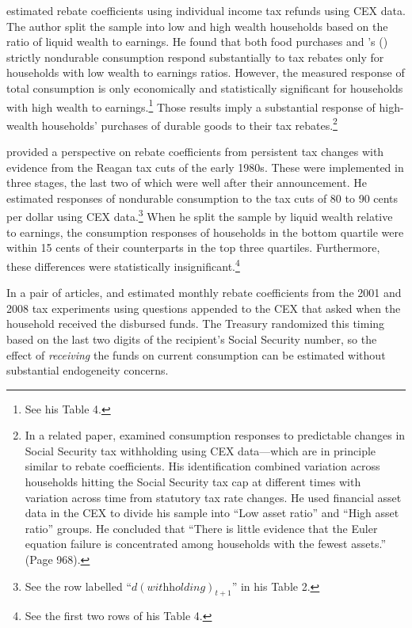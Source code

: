 \documentclass[fleqccn,12pt]{article}
\newcommand{\cites}[1]{\citeauthor{#1}'s (\citeyear{#1})}
\begin{document}
\cite{aer1999Souleles} estimated rebate coefficients using individual income tax refunds using CEX data. The author split the sample into low and high wealth households based on the ratio of liquid wealth to earnings. He found that both food purchases and \cites{jbes1996Lusardi} strictly nondurable consumption respond substantially to tax rebates only for households with low wealth to earnings ratios.  However, the measured response of total consumption is only economically and statistically significant for households with high wealth to earnings.\footnote{See his Table 4.}  Those results imply a substantial response of high-wealth households' purchases of durable goods to their tax rebates.\footnote{In a related paper, \cite{aer1999Parker} examined consumption responses to predictable changes in Social Security tax withholding using CEX data---which are in principle similar to rebate coefficients. His identification combined variation across households hitting the Social Security tax cap at different times with variation across time from statutory tax rate changes. He used financial asset data in the CEX to divide his sample into ``Low asset ratio'' and ``High asset ratio'' groups.  He concluded that ``There is little evidence that the Euler equation failure is concentrated among households with the fewest assets.'' (Page 968). }

\cite{jpube2002Souleles} provided a perspective on rebate coefficients from persistent tax changes with evidence from the Reagan tax cuts of the early 1980s. These were implemented in three stages, the last two of which were well after their announcement. He estimated responses of nondurable consumption to the tax cuts of 80 to 90 cents per dollar using CEX data.\footnote{See the row labelled ``$d(\textit{withholding})_{t+1}$'' in his Table 2.} When he split the sample by liquid wealth relative to earnings, the consumption responses of households in the bottom quartile  were within 15 cents of their counterparts in the top three quartiles. Furthermore, these differences were statistically insignificant.\footnote{See the first two rows of his Table 4.} 

In a pair of articles, \citet*{aer2006JohnsonParkerSouleles} and \citet*{aer2013ParkerSoulelesJohnsonMcClelland} estimated monthly rebate coefficients from the 2001 and 2008 tax experiments using questions appended to the CEX that asked when the household received the disbursed funds. The Treasury randomized this timing based on the last two digits of the recipient's Social Security number, so the effect of \emph{receiving} the funds on current consumption can be estimated without substantial endogeneity concerns.  
\end{document}
